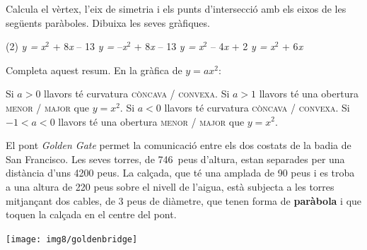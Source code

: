 \begin{mylist}
	

\exer  Calcula el vèrtex, l'eix de simetria i els punts d'intersecció amb els eixos de les següents paràboles. Dibuixa les seves gràfiques.

\begin{tasks}(2)
	\task  \textit{y =} \textit{x}${}^{2}$ + 8\textit{x} -- 13                          
	\task  \textit{y =} --\textit{x}${}^{2}$ + 8\textit{x} -- 13          
	\task  \textit{y =} \textit{x}${}^{2}$ -- 4\textit{x} + 2  
	\task  \textit{y =} \textit{x}${}^{2}$ + 6\textit{x                                  }
\end{tasks}




\exer \spen Completa aquest resum. En la gràfica de $y = ax^{2}$:
\begin{tasks} 
\task Si  $a > 0$ llavors té curvatura \quad \textsc{còncava} / \textsc{convexa}.
%
\task  Si $a > 1$ llavors té una obertura \quad \textsc{menor} / \textsc{major} \quad que $y=x^{2}$.
%
\task Si  $a < 0$ llavors té curvatura \quad \textsc{còncava} / \textsc{convexa}.
%
\task Si $-1<a<0$ llavors té una obertura \quad \textsc{menor} / \textsc{major} \quad que $y=x^{2}$.
\end{tasks}


	\vspace{-2.5cm}
\exer  \begin{minipage}[t]{0.65\textwidth}
	El pont \textit{Golden Gate} permet la comunicació entre els dos costats de la badia de San Francisco. Les seves torres, de 746~peus d'altura, estan separades per una distància d'uns 4200 peus. La calçada, que té una amplada de 90 peus i es troba a una altura de 220 peus sobre el nivell de l'aigua, està subjecta a les torres mitjançant dos cables, de 3 peus de diàmetre, que tenen forma de \textbf{paràbola} i que toquen la calçada en el centre del pont. 
\end{minipage}
\begin{minipage}{0.25\textwidth}
	\vspace{2.5cm}
	\raggedright
	\texttt{[image: img8/goldenbridge]}
\end{minipage}


\end{mylist}
